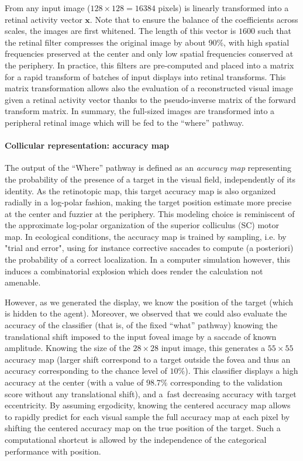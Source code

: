 From any input image ($128\times 128=16384$ pixels) is linearly transformed into a retinal activity vector $\boldsymbol{x}$. Note that to ensure the balance of the coefficients across scales, the images are first whitened. The length of this vector is $1600$ such that the retinal filter compresses the original image by about 90\%, with high spatial frequencies preserved at the center and only low spatial frequencies conserved at the periphery. In practice, this filters are pre-computed and placed into a matrix for a rapid transform of batches of input displays into retinal transforms. This matrix transformation allows also the evaluation of a reconstructed visual image given a retinal activity vector thanks to the pseudo-inverse matrix of the forward transform matrix. In summary, the full-sized images are transformed into a peripheral retinal image which will be fed to the ``where'' pathway.

\paragraph{Collicular representation: accuracy map}
The output of the ``Where'' pathway is defined as an \emph{accuracy map} representing the probability of the presence of a target in the visual field, independently of its identity. As the retinotopic map, this target accuracy map is also organized radially in a log-polar fashion, making the target position estimate more precise at the center and fuzzier at the periphery. This modeling choice is reminiscent of the approximate log-polar organization of the superior colliculus (SC) motor map. In ecological conditions, the accuracy map is trained by sampling, i.e. by "trial and error", using for instance corrective saccades to compute (a posteriori) the probability of a correct localization. In a computer simulation however, this induces a combinatorial explosion which does render the calculation not amenable.

However, as we generated the display, we know the position of the target (which is hidden to the agent). Moreover, we observed that we could also evaluate the accuracy of the classifier (that is, of the fixed ``what'' pathway) knowing the translational shift imposed to the input foveal image by a saccade of known amplitude. Knowing the size of the $28\times 28$ input image, this generates a $55\times 55$ accuracy map (larger shift correspond to a target outside the fovea and thus an accuracy corresponding to the chance level of $10\%$). This classifier displays a high accuracy at the center (with a value of $98.7\%$ corresponding to the validation score without any translational shift), and a fast decreasing accuracy with target eccentricity. %
By assuming ergodicity, knowing the centered accuracy map allows to rapidly predict for each visual sample the full accuracy map at each pixel by shifting the centered accuracy map on the true position of the target. Such a computational shortcut is allowed by the independence of the categorical performance with position. %

